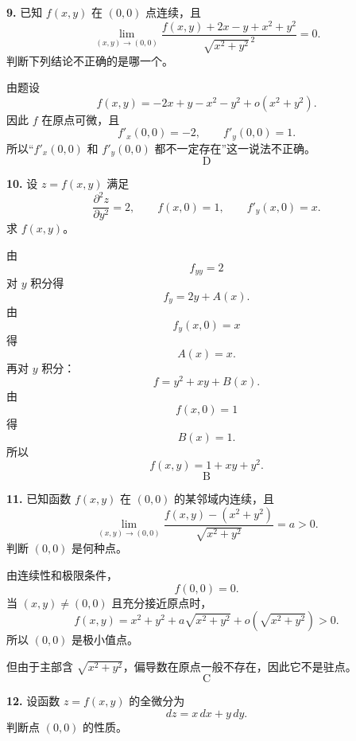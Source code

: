 \begin{problemblock}
\textbf{9.} 已知 \(f(x,y)\) 在 \((0,0)\) 点连续，且
\[
\lim_{(x,y)\to(0,0)}
\frac{f(x,y)+2x-y+x^2+y^2}{\sqrt{x^2+y^2}^{\,2}}=0.
\]
判断下列结论不正确的是哪一个。
\end{problemblock}

\begin{solutionblock}
由题设
\[
f(x,y)=-2x+y-x^2-y^2+o(x^2+y^2).
\]
因此 \(f\) 在原点可微，且
\[
f'_x(0,0)=-2,\qquad f'_y(0,0)=1.
\]
所以“\(f'_x(0,0)\) 和 \(f'_y(0,0)\) 都不一定存在”这一说法不正确。
\[
\boxed{\text{D}}
\]
\end{solutionblock}

\begin{problemblock}
\textbf{10.} 设 \(z=f(x,y)\) 满足
\[
\frac{\partial^2 z}{\partial y^2}=2,\qquad f(x,0)=1,\qquad f'_y(x,0)=x.
\]
求 \(f(x,y)\)。
\end{problemblock}

\begin{solutionblock}
由
\[
f_{yy}=2
\]
对 \(y\) 积分得
\[
f_y=2y+A(x).
\]
由
\[
f_y(x,0)=x
\]
得
\[
A(x)=x.
\]
再对 \(y\) 积分：
\[
f=y^2+xy+B(x).
\]
由
\[
f(x,0)=1
\]
得
\[
B(x)=1.
\]
所以
\[
\boxed{f(x,y)=1+xy+y^2}.
\]
\[
\boxed{\text{B}}
\]
\end{solutionblock}

\begin{problemblock}
\textbf{11.} 已知函数 \(f(x,y)\) 在 \((0,0)\) 的某邻域内连续，且
\[
\lim_{(x,y)\to(0,0)}
\frac{f(x,y)-(x^2+y^2)}{\sqrt{x^2+y^2}}=a>0.
\]
判断 \((0,0)\) 是何种点。
\end{problemblock}

\begin{solutionblock}
由连续性和极限条件，
\[
f(0,0)=0.
\]
当 \((x,y)\ne(0,0)\) 且充分接近原点时，
\[
f(x,y)=x^2+y^2+a\sqrt{x^2+y^2}+o(\sqrt{x^2+y^2})>0.
\]
所以 \((0,0)\) 是极小值点。

但由于主部含 \(\sqrt{x^2+y^2}\)，偏导数在原点一般不存在，因此它不是驻点。
\[
\boxed{\text{C}}
\]
\end{solutionblock}

\begin{problemblock}
\textbf{12.} 设函数 \(z=f(x,y)\) 的全微分为
\[
dz=x\,dx+y\,dy.
\]
判断点 \((0,0)\) 的性质。
\end{problemblock}

